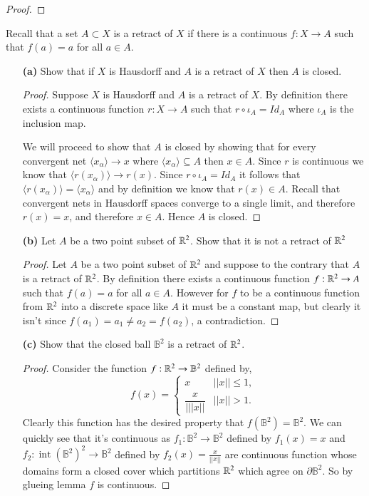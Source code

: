 \documentclass{homework651}
\DeclareMathOperator{\interior}{int}
\begin{document}
\begin{problems}
\begin{proof}
\end{proof}


\problem Recall that a set $A \subset X$ is a retract of $X$ if there is a continuous $f: X \to A$ such that 
$f(a) = a$ for all $a \in A$.
\begin{enumerate}
    \item[\textbf{(a)}] Show that if $X$ is Hausdorff and $A$ is a retract of $X$ then $A$ is closed. 
    \begin{proof} Suppose $X$ is Hausdorff and $A$ is a retract of $X$. By definition there exists a continuous function $r: X \to A$ such that $r\circ \iota_A = Id_A$ where $\iota_A$ is the inclusion map. 

        We will proceed to show that $A$ is closed by showing that for every convergent net $\langle x_\alpha \rangle \to x$ where $\langle x_\alpha \rangle \subseteq A$ then $x \in A$. Since $r$ is continuous we know that $\langle r(x_{\alpha}) \rangle \to r(x)$. Since $r\circ \iota_A = Id_A$ it follows that $\langle r(x_{\alpha}) \rangle = \langle x_\alpha \rangle$ and by definition we know that $r(x) \in A$. Recall that convergent nets in Hausdorff spaces converge to a single limit, and therefore $r(x) = x$, and therefore $x \in A$. Hence $A$ is closed.     
    \end{proof}
    \item[\textbf{(b)}] Let $A$ be a two point subset of $\RR^2$. Show that it is not a retract of $\RR^2$
    \begin{proof} Let $A$ be a two point subset of $\RR^2$ and suppose to the contrary that $A$ is a retract of $\RR^2$. 
        By definition there exists a continuous function $f: \RR^2 \to A$ such that 
        $f(a) = a$ for all $a \in A$. However for $f$ to be a continuous function from $\RR^2$ into a discrete space like $A$
        it must be a constant map, but clearly it isn't since $f(a_1) = a_1 \neq a_2 = f(a_2)$, a contradiction. 

    \end{proof}
    \item[\textbf{(c)}] Show that the closed ball $\mathbb{B}^2$ is a retract of $\RR^2$. 
    \begin{proof} Consider the function $f:\RR^2 \to \mathbb{B}^2$ defined by, 
        \begin{equation*}
            f(x) = \begin{cases}
                x & ||x|| \leq 1,\\
                \dfrac{x}{|||x||} & ||x|| > 1.
            \end{cases}
        \end{equation*}
        Clearly this function has the desired property that $f(\mathbb{B}^2) = \mathbb{B}^2$. We can quickly see that it's continuous 
        as $f_1: \mathbb{B}^2 \to \mathbb{B}^2$ defined by $f_1(x) = x$ and $f_2 : \interior(\mathbb{B}^2)^2 \to \mathbb{B}^2$ defined by $f_2(x) = \frac{x}{||x||}$
        are continuous function whose domains form a closed cover which partitions $\RR^2$ which agree on $\partial \mathbb{B}^2$. So by glueing lemma $f$
        is continuous.  


\end{proof}
\end{enumerate}
\end{problems}
\end{document}
